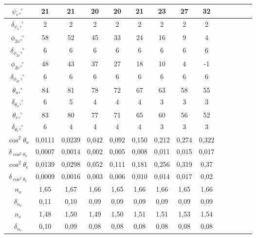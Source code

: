 \documentclass[a4paper, 12pt]{article}%
\begin{document}
\begin{enumerate}
\begin{center}
\begin{tabular}{|c|c|c|c|c|c|c|c|c|c|c|c|c|c|}
$\psi_e, ^{\circ}$             & 21     & 21     & 20    & 20    & 21    & 23    & 27    & 32    \\ \hline
$\delta_{\psi_e}, ^{\circ}$    & 2      & 2      & 2     & 2     & 2     & 2     & 2     & 2      \\ \hline
$\phi_{2o},  ^{\circ}$         & 58     & 52     & 45    & 33    & 24    & 16    & 9     & 4     \\ \hline
$\delta_{\phi_{2o}}, ^{\circ}$ & 6      & 6      & 6     & 6     & 6     & 6     & 6     & 6     \\ \hline
$\phi_{2e}, ^{\circ}$          & 48     & 43     & 37    & 27     & 18    & 10     & 4     & -1    \\ \hline
$\delta_{\phi_{2e}}, ^{\circ}$ & 6      & 6      & 6     & 6     & 6     & 6     & 6     & 6     \\ \hline
$\theta_o, ^{\circ}$           & 84     & 81     & 78    & 72    & 67    & 63    & 58    & 55    \\ \hline
$\delta_{\theta_o}, ^{\circ}$  & 6      & 5      & 4     & 4     & 4      & 3     & 3     & 3     \\ \hline
$\theta_e, ^{\circ}$           & 83     & 80     & 77    & 71    & 65    & 60    & 56     & 52    \\ \hline
$\delta_{\theta_e}, ^{\circ}$  & 6      & 4      & 4     & 4     & 4     & 3     & 3     & 3     \\ \hline
$\cos^2\theta_o$               & 0,0111 & 0,0239 & 0,042 & 0,092 & 0,150 & 0,212 & 0,274 & 0,322 \\ \hline
$\delta_{\cos^2\theta_o}$      & 0,0007 & 0,0014 & 0,002 & 0,005 & 0,008 & 0,011 & 0,015 & 0,017 \\ \hline
$\cos^2\theta_e$               & 0,0139 & 0,0298 & 0,052 & 0,111 & 0,181 & 0,256 & 0,319 & 0,37  \\ \hline
$\delta_{\cos^2\theta_e}$      & 0,0009 & 0,0016 & 0,003 & 0,006 & 0,010 & 0,014 & 0,017 & 0,02  \\ \hline
$n_o$                          & 1,65   & 1,67   & 1,66  & 1,65  & 1,66  & 1,66  & 1,65  & 1,66  \\ \hline
$\delta_{n_o}$                 & 0,11   & 0,10   & 0,09  & 0,09  & 0,09  & 0,09  & 0,09  & 0,09  \\ \hline
$n_e$                          & 1,48   & 1,50   & 1,49  & 1,50  & 1,51  & 1,51  & 1,53  & 1,54  \\ \hline
$\delta_{n_e}$                 & 0,10   & 0,09   & 0,08  & 0,08  & 0,08  & 0,08  & 0,08  & 0,08  \\ \hline

\end{tabular}
\end{center}
\end{enumerate}
\end{document}
